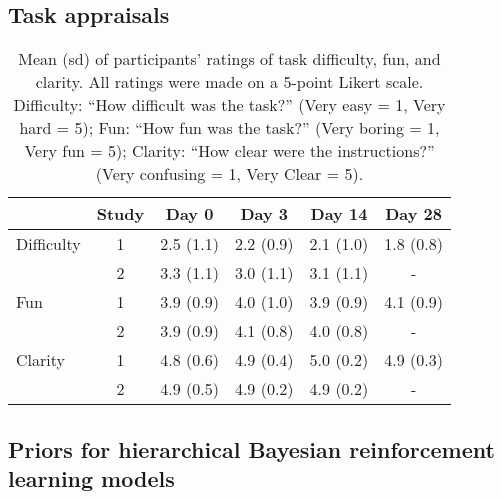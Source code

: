 \documentclass[a4paper,12pt]{article}
\begin{document}
\begin{refsection}[supp]
\clearpage
\subsection*{Task appraisals}

\begin{table}[h!]
    \centering
    \begin{tabular}{lccccc}
    \toprule
               & Study &   Day 0 &      Day 3 &     Day 14 &     Day 28 \\
    \midrule
    Difficulty &  1 &  2.5 (1.1) &  2.2 (0.9) &  2.1 (1.0) &  1.8 (0.8) \\
               &  2 &  3.3 (1.1) &  3.0 (1.1) &  3.1 (1.1) &          - \\
    \midrule
    Fun        &  1 &  3.9 (0.9) &  4.0 (1.0) &  3.9 (0.9) &  4.1 (0.9) \\
               &  2 &  3.9 (0.9) &  4.1 (0.8) &  4.0 (0.8) &          - \\
    \midrule
    Clarity    &  1 &  4.8 (0.6) &  4.9 (0.4) &  5.0 (0.2) &  4.9 (0.3) \\
               &  2 &  4.9 (0.5) &  4.9 (0.2) &  4.9 (0.2) &          - \\
    \bottomrule
    \end{tabular}
    \caption{Mean (sd) of participants' ratings of task difficulty, fun, and clarity. All ratings were made on a 5-point Likert scale. Difficulty: ``How difficult was the task?'' (Very easy = 1, Very hard = 5); Fun: ``How fun was the task?'' (Very boring = 1, Very fun = 5); Clarity: ``How clear were the instructions?'' (Very confusing = 1, Very Clear = 5).}
    \label{tab:tabS02}
\end{table}

\clearpage
\subsection*{Priors for hierarchical Bayesian reinforcement learning models}


\end{refsection}
\end{document}
